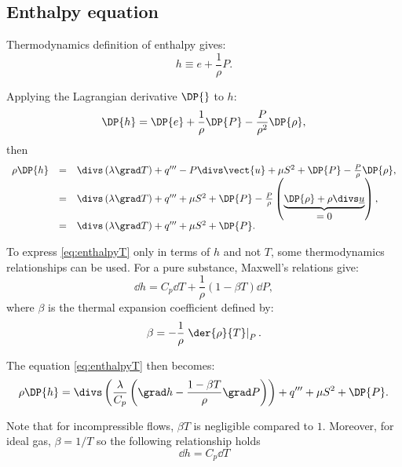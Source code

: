 \subsection{Enthalpy equation}

Thermodynamics definition of enthalpy gives:
\begin{equation}
 h \equiv e+ \dfrac{1}{\rho} P.
\end{equation}

Applying the Lagrangian derivative $\DP{}$ to $h$:
\begin{equation}
 \DP{h}=\DP{e}+\frac{1}{\rho}\DP{P}-\frac{P}{\rho^2}\DP{\rho},
\end{equation}
%
then
\begin{equation}\label{eq:enthalpyT}
\begin{array}{r c l}
  \rho \DP{h} &=& \divs \left( \lambda \grad T \right) +q'''-P\divs \vect{u} + \mu S^2 + \DP{P} -\frac{P}{\rho}\DP{\rho}, \\
   &=& \divs \left( \lambda \grad T \right) +q''' + \mu  S^2 + \DP{P} - \frac{P}{\rho} \left(\underbrace{\DP{\rho} + \rho \divs \underline{u}}_{\displaystyle =0} \right), \\
   &=& \divs \left( \lambda \grad T \right) +q''' + \mu  S^2 + \DP{P}. 
\end{array}
\end{equation}

To express \eqref{eq:enthalpyT} only in terms of $h$ and not $T$, some thermodynamics relationships can be used.
For a pure substance, Maxwell's relations give:
%
\begin{equation}\label{eq:goveqn:dh_dt_dp}
  \dd h=C_p \dd T + \frac{1}{\rho} \left( 1-\beta T \right)\dd P,
\end{equation}
%
where $\beta$ is the thermal expansion coefficient defined by:
\begin{equation}
 \beta= -\frac{1}{\rho}  \left.\der{\rho}{T}\right|_P.
\end{equation}

The equation \eqref{eq:enthalpyT} then becomes:
\begin{equation}\label{eq:enthalpyH}
 \rho \DP{h} = \divs \left( \dfrac{\lambda}{C_p} \left(\grad h -\dfrac{1-\beta T }{\rho}\grad P\right)\right) +q''' + \mu S^2 + \DP{P}.
\end{equation}

\begin{remark}
Note that for incompressible flows, $\beta T$ is negligible compared to $1$. Moreover, for ideal gas, $\beta = 1/T$ so the following relationship holds
\begin{equation}
 \dd h=C_p \dd T
\end{equation}
%
\end{remark}

